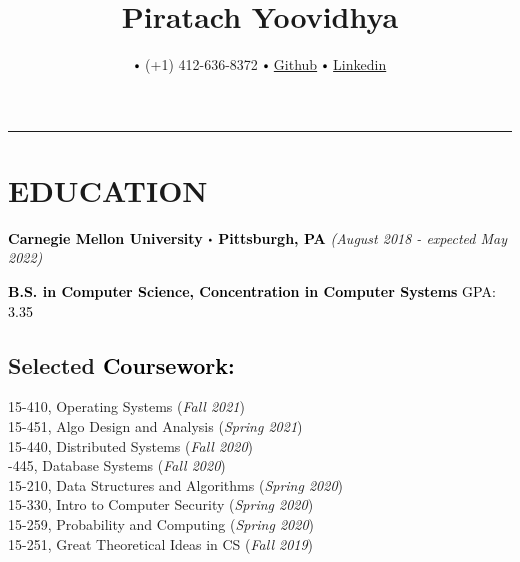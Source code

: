 \documentclass[10pt]{article}
\title{\bfseries\Huge Piratach Yoovidhya}
\author{
  \small \myemail
   $\sbullet[.75]$
   (+1) 412-636-8372
   $\sbullet[.75]$
  \href{https://github.com/Piratach}{Github}
   $\sbullet[.75]$
  \href{https://www.linkedin.com/in/piratach-yoovidhya/}
{Linkedin}
}
\date{}
\newcommand\sbullet[1][.5]{\mathbin{\vcenter{\hbox{\scalebox{#1}{$\bullet$}}}}}
\begin{document}
  \maketitle
  \thispagestyle{empty}
  \vspace*{-1.0cm}
  \hrule
  \vspace*{-0.15cm}

  \section*{\large \textcolor{lighterB}{EDUCATION}}
  \vspace*{-0.3cm}
  \textbf{\large \textcolor{Black}{Carnegie Mellon University $\sbullet$ Pittsburgh, PA}} \hfill \textit{(August 2018 - expected May 2022)}

  \vspace{0.05cm}

  \textcolor{Black}{\textbf{B.S. in Computer Science, Concentration in Computer Systems} \hfill GPA: 3.35}%

  \vspace{0.2cm}

  \vspace*{-0.5cm}

  \subsection*{Selected \textcolor{Black}{Coursework:}}

    \vspace*{-0.55cm}
    \begin{multicols}{2}
       15-410, Operating Systems (\textit{Fall 2021}) \\
       15-451, Algo Design and Analysis (\textit{Spring 2021}) \\
       15-440, Distributed Systems (\textit{Fall 2020}) \\
       -445, Database Systems (\textit{Fall 2020}) \\
       15-210, Data Structures and Algorithms (\textit{Spring 2020}) \\
       15-330, Intro to Computer Security (\textit{Spring 2020}) \\
       15-259, Probability and Computing (\textit{Spring 2020}) \\
       15-251, Great Theoretical Ideas in CS (\textit{Fall 2019})
    \end{multicols}
\end{document}
